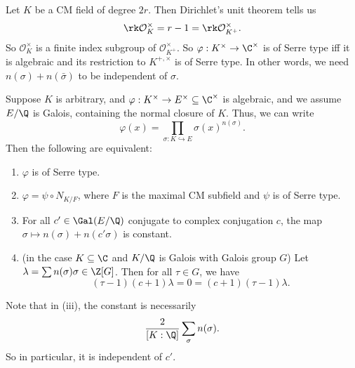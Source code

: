 \documentclass[a4paper]{article}
\begin{document}
\begin{eg}
  Let $K$ be a CM field of degree $2r$. Then Dirichlet's unit theorem tells us
  \[
    \rk \mathcal{O}_K^\times = r - 1 = \rk \mathcal{O}_{K^+}^\times.
  \]
  So $\mathcal{O}_K^\times$ is a finite index subgroup of $\mathcal{O}_{K^+}^\times$. So $\varphi: K^\times \to \C^\times$ is of Serre type iff it is algebraic and its restriction to $K^{+, \times}$ is of Serre type. In other words, we need $n(\sigma) + n(\bar{\sigma})$ to be independent of $\sigma$.
\end{eg}

\begin{thm}
  Suppose $K$ is arbitrary, and $\varphi: K^\times \to E^\times \subseteq \C^\times$ is algebraic, and we assume $E/\Q$ is Galois, containing the normal closure of $K$. Thus, we can write
  \[
    \varphi(x) = \prod_{\sigma: K \hookrightarrow E} \sigma(x)^{n(\sigma)}.
  \]
  Then the following are equivalent:
  \begin{enumerate}
    \item $\varphi$ is of Serre type.
    \item $\varphi = \psi \circ N_{K/F}$, where $F$ is the maximal CM subfield and $\psi$ is of Serre type.
    \item For all $c' \in \Gal(E/\Q)$ conjugate to complex conjugation $c$, the map $\sigma \mapsto n(\sigma) + n (c' \sigma)$ is constant.
    \item (in the case $K \subseteq \C$ and $K/\Q$ is Galois with Galois group $G$) Let $\lambda = \sum n(\sigma) \sigma \in \Z[G]$. Then for all $\tau \in G$, we have
      \[
        (\tau - 1)(c + 1) \lambda = 0 = (c + 1)(\tau - 1) \lambda.
      \]
  \end{enumerate}
\end{thm}
Note that in (iii), the constant is necessarily
\[
  \frac{2}{[K:\Q]} \sum_\sigma n(\sigma).
\]
So in particular, it is independent of $c'$.
\end{document}
